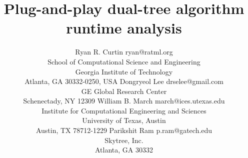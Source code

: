 \documentclass[twoside,11pt]{article} %
\begin{document}
\title{Plug-and-play dual-tree algorithm runtime analysis}

\author{\name Ryan R. Curtin \email ryan@ratml.org\\
  \addr School of Computational Science and Engineering\\
  Georgia Institute of Technology\\
  Atlanta, GA 30332-0250, USA
  \AND
  \name Dongryeol Lee \email drselee@gmail.com\\
  \addr GE Global Research Center\\
  Schenectady, NY 12309
  \AND
  \name William B. March \email march@ices.utexas.edu\\
  \addr Institute for Computational Engineering and Sciences\\
  University of Texas, Austin\\
  Austin, TX 78712-1229
  \AND
  \name Parikshit Ram \email p.ram@gatech.edu\\
  \addr Skytree, Inc.\\
  Atlanta, GA 30332
}


\maketitle
\end{document}
